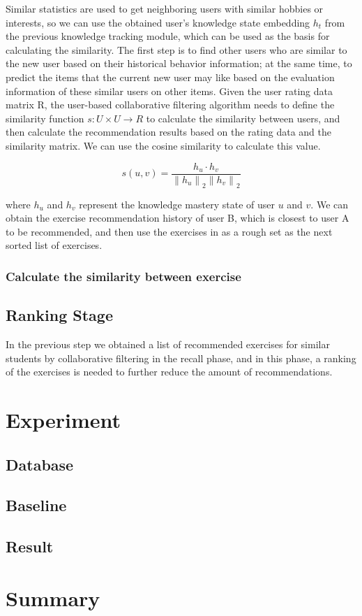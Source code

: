 Similar statistics are used to get neighboring users with similar hobbies or interests, so we can use the obtained user's knowledge state embedding $h_t$ from the previous knowledge tracking module, which can be used as the basis for calculating the similarity. The first step is to find other users who are similar to the new user based on their historical behavior information; at the same time, to predict the items that the current new user may like based on the evaluation information of these similar users on other items. Given the user rating data matrix R, the user-based collaborative filtering algorithm needs to define the similarity function $s : U \times U \to R$ to calculate the similarity between users, and then calculate the recommendation results based on the rating data and the similarity matrix. We can use the cosine similarity to calculate this value.

$$
s(u, v)=\frac{h_{u} \cdot h_{v}}{\left\|h_{u}\right\|_{2}\left\|h_{v}\right\|_{2}}


$$

where $h_u$ and $h_v$ represent the knowledge mastery state of user $u$ and $v$.
We can obtain the exercise recommendation history  of user B, which is closest to user A to be recommended, and then use the exercises in  as a rough set as the next sorted list of exercises.
\subsubsection{Calculate the similarity between exercise}



\subsection{Ranking Stage}
In the previous step we obtained a list of recommended exercises for similar students by collaborative filtering in the recall phase, and in this phase, a ranking of the exercises is needed to further reduce the amount of recommendations.

\section{Experiment}

\subsection{Database}
\subsection{Baseline}
\subsection{Result}

\section{Summary}